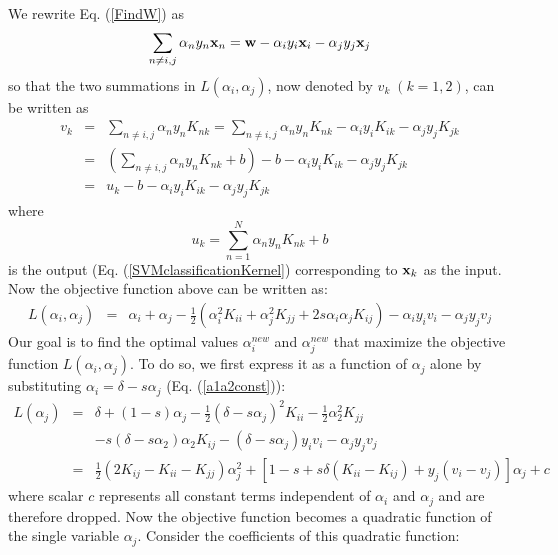 \documentclass{article}
\begin{document}
We rewrite Eq. (\ref{FindW}) as
\begin{equation}
  \sum_{n\ne i,j}\alpha_ny_n{\bf x}_n
  ={\bf w}-\alpha_iy_i{\bf x}_i-\alpha_jy_j{\bf x}_j
\end{equation}
so that the two summations in $L(\alpha_i,\alpha_j)$, now denoted by
$v_k\;(k=1,2)$, can be written as
\begin{eqnarray}
  v_k&=&\sum_{n\ne i,j}\alpha_ny_nK_{nk}
  =\sum_{n\ne i,j}\alpha_ny_nK_{nk}-\alpha_iy_iK_{ik}-\alpha_jy_jK_{jk}
  \nonumber\\
  &=&\left(\sum_{n\ne i,j}\alpha_ny_nK_{nk}+b\right)
  -b-\alpha_iy_iK_{ik}-\alpha_jy_jK_{jk}
  \nonumber\\
  &=&u_k-b-\alpha_iy_iK_{ik}-\alpha_jy_jK_{jk}
\end{eqnarray}
where 
\begin{equation}
  u_k=\sum_{n=1}^N\alpha_ny_nK_{nk}+b
\end{equation}
is the output (Eq. (\ref{SVMclassificationKernel}) corresponding to
${\bf x}_k$ as the input. Now the objective function above can be 
written as:
\begin{eqnarray}
  L(\alpha_i,\alpha_j)&=&\alpha_i+\alpha_j-\frac{1}{2}
  (\alpha_i^2 K_{ii}+\alpha_j^2K_{jj}
  +2s\alpha_i\alpha_jK_{ij})-\alpha_iy_iv_i-\alpha_jy_jv_j
\end{eqnarray}
Our goal is to find the optimal values $\alpha_i^{new}$ and $\alpha_j^{new}$ 
that maximize the objective function $L(\alpha_i,\alpha_j)$. To do so, 
we first express it as a function of $\alpha_j$ alone by substituting
$\alpha_i=\delta-s\alpha_j$ (Eq. (\ref{a1a2const})):
\begin{eqnarray}
  L(\alpha_j)&=&\delta+(1-s)\alpha_j-\frac{1}{2}(\delta-s\alpha_j)^2K_{ii}
  -\frac{1}{2}\alpha_2^2K_{jj}
  \nonumber\\
  &&-s(\delta-s\alpha_2)\alpha_2K_{ij}
  -(\delta-s\alpha_j)y_iv_i-\alpha_jy_jv_j
  \nonumber\\
  &=&\frac{1}{2}(2K_{ij}-K_{ii}-K_{jj})\alpha_j^2
  +[1-s+s\delta(K_{ii}-K_{ij})+y_j(v_i-v_j)]\alpha_j+c
\end{eqnarray}
where scalar $c$ represents all constant terms independent of $\alpha_i$
and $\alpha_j$ and are therefore dropped. Now the objective function 
becomes a quadratic function of the single variable $\alpha_j$. Consider 
the coefficients of this quadratic function:
\end{document}
